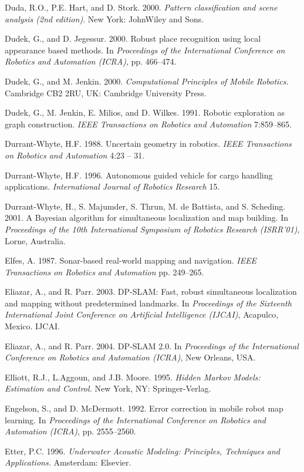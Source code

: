 \documentclass[10pt,a4paper]{article}
\begin{document}
Duda, R.O., P.E. Hart, and D. Stork. 2000. \textit{Pattern classification and scene analysis (2nd
edition)}. New York: JohnWiley and Sons.

Dudek, G., and D. Jegessur. 2000. Robust place recognition using local appearance
based methods. In \textit{Proceedings of the International Conference on Robotics and Automation
(ICRA)}, pp. 466–474.

Dudek, G., and M. Jenkin. 2000. \textit{Computational Principles of Mobile Robotics.} Cambridge
CB2 2RU, UK: Cambridge University Press.

Dudek, G., M. Jenkin, E. Milios, and D. Wilkes. 1991. Robotic exploration as graph
construction. \textit{IEEE Transactions on Robotics and Automation} 7:859–865.

Durrant-Whyte, H.F. 1988. Uncertain geometry in robotics. \textit{IEEE Transactions on
Robotics and Automation} 4:23 – 31.

Durrant-Whyte, H.F. 1996. Autonomous guided vehicle for cargo handling applications.
\textit{International Journal of Robotics Research} 15.

Durrant-Whyte, H., S. Majumder, S. Thrun, M. de Battista, and S. Scheding. 2001. A
Bayesian algorithm for simultaneous localization and map building. In \textit{Proceedings
of the 10th International Symposium of Robotics Research (ISRR’01)}, Lorne, Australia.

Elfes, A. 1987. Sonar-based real-world mapping and navigation. \textit{IEEE Transactions on
Robotics and Automation} pp. 249–265.

Eliazar, A., and R. Parr. 2003. DP-SLAM: Fast, robust simultaneous localization and
mapping without predetermined landmarks. In \textit{Proceedings of the Sixteenth International
Joint Conference on Artificial Intelligence (IJCAI)}, Acapulco, Mexico. IJCAI.

Eliazar, A., and R. Parr. 2004. DP-SLAM 2.0. In \textit{Proceedings of the International Conference
on Robotics and Automation (ICRA)}, New Orleans, USA.

Elliott, R.J., L.Aggoun, and J.B. Moore. 1995. \textit{Hidden Markov Models: Estimation and
Control.} New York, NY: Springer-Verlag.

Engelson, S., and D. McDermott. 1992. Error correction in mobile robot map learning.
In \textit{Proceedings of the International Conference on Robotics and Automation (ICRA)}, pp.
2555–2560.

Etter, P.C. 1996. \textit{Underwater Acoustic Modeling: Principles, Techniques and Applications.}
Amsterdam: Elsevier.
\end{document}
